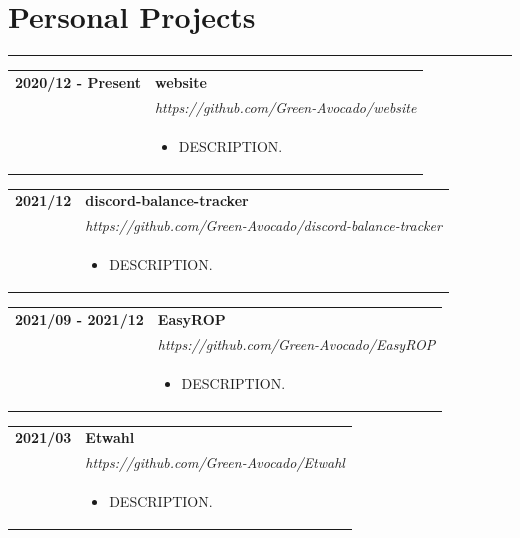 \documentclass[letterpaper]{article}
\newcommand{\sect}[1]{\section*{#1}
                        {\color{cyan}
                        \rule{\textwidth}{1pt}
                        \vspace{-1ex}}}
\begin{document}
    \sect{Personal Projects}

        \begin{tabular}{p{} p{}} 
            \textbf{2020/12 - Present} & \textbf{website} \\
            & \emph{https://github.com/Green-Avocado/website} \\
            & \begin{itemize}
                \item DESCRIPTION.
            \end{itemize}
            \\
        \end{tabular}

        \begin{tabular}{p{} p{}} 
            \textbf{2021/12} & \textbf{discord-balance-tracker} \\
            & \emph{https://github.com/Green-Avocado/discord-balance-tracker} \\
            & \begin{itemize}
                \item DESCRIPTION.
            \end{itemize}
            \\
        \end{tabular}

        \begin{tabular}{p{} p{}} 
            \textbf{2021/09 - 2021/12} & \textbf{EasyROP} \\
            & \emph{https://github.com/Green-Avocado/EasyROP} \\
            & \begin{itemize}
                \item DESCRIPTION.
            \end{itemize}
            \\
        \end{tabular}

        \begin{tabular}{p{} p{}} 
            \textbf{2021/03} & \textbf{Etwahl} \\
            & \emph{https://github.com/Green-Avocado/Etwahl} \\
            & \begin{itemize}
                \item DESCRIPTION.
            \end{itemize}
            \\
        \end{tabular}
\end{document}
